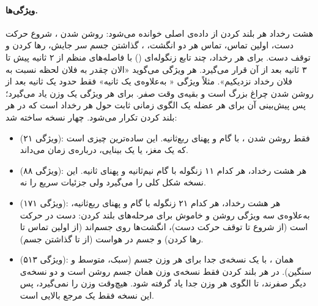 \paragraph{ویژگی‌ها.} هشت رخداد هر بلند کردن از داده‌ی اصلی خوانده می‌شود: روشن شدن ، شروع حرکت دست، اولین تماس، تماس هر دو انگشت، ، گذاشتن جسم سر جایش، رها کردن و توقف دست. برای هر رخداد، چند تابع زنگوله‌ای () با فاصله‌های منظم از ۲ ثانیه پیش تا ۳ ثانیه بعد از آن قرار می‌گیرد. هر ویژگی می‌گوید «الان چقدر به فلان لحظه نسبت به فلان رخداد نزدیکیم». مثلاً ویژگی « به‌علاوه‌ی یک ثانیه» فقط حدود یک ثانیه بعد از روشن شدن چراغ بزرگ است و بقیه‌ی وقت صفر.  برای هر ویژگی یک وزن یاد می‌گیرد؛ پس پیش‌بینی آن برای هر عضله یک الگوی زمانی ثابت حول هر رخداد است که در هر بلند کردن تکرار می‌شود. چهار نسخه ساخته شد:
\begin{itemize}
\item \textbf{} (۲۱ ویژگی): فقط روشن شدن ، با گام و پهنای ربع‌ثانیه. این ساده‌ترین چیزی است که یک مغز، یا یک  بینایی، درباره‌ی زمان می‌داند.
\item \textbf{} (۸۸ ویژگی): هر هشت رخداد، هر کدام ۱۱ زنگوله با گام نیم‌ثانیه و پهنای  ثانیه. این نسخه شکل کلی را می‌گیرد ولی جزئیات سریع را نه.
\item \textbf{} (۱۷۱ ویژگی): هر هشت رخداد، هر کدام ۲۱ زنگوله با گام و پهنای ربع‌ثانیه، به‌علاوه‌ی سه ویژگی روشن و خاموش برای مرحله‌های بلند کردن: دست در حرکت است (از شروع تا توقف حرکت دست)، انگشت‌ها روی جسم‌اند (از اولین تماس تا رها کردن) و جسم در هواست (از  تا گذاشتن جسم).
\item \textbf{} (۵۱۳ ویژگی): همان ، با یک نسخه‌ی جدا برای هر وزن جسم (سبک، متوسط و سنگین). در هر بلند کردن فقط نسخه‌ی وزن همان جسم روشن است و دو نسخه‌ی دیگر صفرند، تا الگوی هر وزن جدا یاد گرفته شود.  هیچ‌وقت وزن را نمی‌گیرد، پس این نسخه فقط یک مرجع بالایی است.
\end{itemize}


